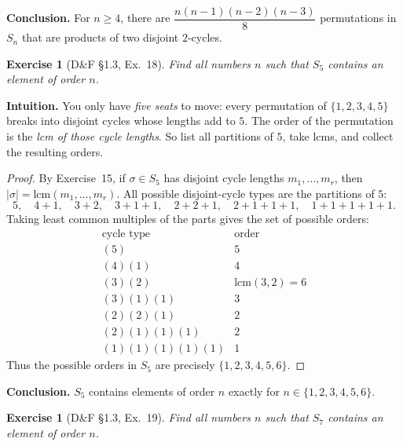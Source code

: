 \documentclass[12pt]{article}
\newtheorem{exercise}[theorem]{Exercise}
\theoremstyle{definition}
\begin{document}
\textbf{Conclusion.} For $n\ge 4$, there are $\dfrac{n(n-1)(n-2)(n-3)}{8}$ permutations in $S_n$
that are products of two disjoint $2$-cycles.

\newpage

\begin{exercise}[D\&F §1.3, Ex.~18]
Find all numbers $n$ such that $S_{5}$ contains an element of order $n$.
\end{exercise}

\dotfill

\noindent\textbf{Intuition.}
You only have \emph{five seats} to move: every permutation of $\{1,2,3,4,5\}$ breaks into disjoint cycles whose lengths add to $5$.
The order of the permutation is the \emph{lcm of those cycle lengths}. So list all partitions of $5$, take lcms, and collect the resulting orders.

\dotfill

\begin{proof}
By Exercise~15, if $\sigma\in S_{5}$ has disjoint cycle lengths $m_{1},\dots,m_{r}$, then $|\sigma|=\mathrm{lcm}(m_{1},\dots,m_{r})$.
All possible disjoint-cycle types are the partitions of $5$:
\[
5,\quad 4+1,\quad 3+2,\quad 3+1+1,\quad 2+2+1,\quad 2+1+1+1,\quad 1+1+1+1+1.
\]
Taking least common multiples of the parts gives the set of possible orders:
\[
\begin{array}{c|c}
\text{cycle type} & \text{order}\\ \hline
(5) & 5\\
(4)(1) & 4\\
(3)(2) & \mathrm{lcm}(3,2)=6\\
(3)(1)(1) & 3\\
(2)(2)(1) & 2\\
(2)(1)(1)(1) & 2\\
(1)(1)(1)(1)(1) & 1
\end{array}
\]
Thus the possible orders in $S_{5}$ are precisely $\{1,2,3,4,5,6\}$.
\end{proof}

\textbf{Conclusion.} $S_{5}$ contains elements of order $n$ exactly for $n\in\{1,2,3,4,5,6\}$. \qedhere

\newpage

\begin{exercise}[D\&F §1.3, Ex.~19]
Find all numbers $n$ such that $S_{7}$ contains an element of order $n$.
\end{exercise}
\end{document}
